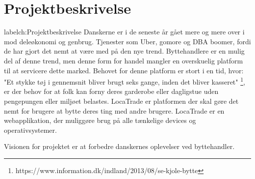 \chapter{Projektbeskrivelse}label{ch:Projektbeskrivelse}
Danskerne er i de seneste år gået mere og mere over i mod deleøkonomi og genbrug. Tjenester som Uber, gomore og DBA boomer, fordi de har gjort det nemt at være med på den nye trend. Byttehandlere er en mulig del af denne trend, men denne form for handel mangler en overskuelig platform til at servicere dette marked. Behovet for denne platform er stort i en tid, hvor: "Et stykke tøj i gennemsnit bliver brugt seks gange, inden det bliver kasseret" \footnote{https://www.information.dk/indland/2013/08/se-kjole-bytte}, er der behov for at folk kan forny deres garderobe eller dagligstue uden pengepungen eller miljøet belastes.
LocaTrade er platformen der skal gøre det nemt for brugere at bytte deres ting med andre brugere. LocaTrade er en webapplikation, der muliggøre brug på alle tænkelige devices og operativsystemer. 

Visionen for projektet er at forbedre danskernes oplevelser ved byttehandler. 




